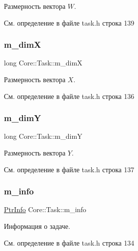 Размерность вектора $W$. 

См. определение в файле task.\+h строка 139

\hypertarget{class_core_1_1_task_a3314c516035accea22900aede28ee64b}{}\label{class_core_1_1_task_a3314c516035accea22900aede28ee64b} 
\subsubsection{\texorpdfstring{m\+\_\+dimX}{m\_dimX}}
{\footnotesize\ttfamily long Core\+::\+Task\+::m\+\_\+dimX\hspace{0.3cm}{\ttfamily [protected]}}

Размерность вектора $X$. 

См. определение в файле task.\+h строка 136

\hypertarget{class_core_1_1_task_aa317bebd7f5dbfa5dc86463cb0377b12}{}\label{class_core_1_1_task_aa317bebd7f5dbfa5dc86463cb0377b12} 
\subsubsection{\texorpdfstring{m\+\_\+dimY}{m\_dimY}}
{\footnotesize\ttfamily long Core\+::\+Task\+::m\+\_\+dimY\hspace{0.3cm}{\ttfamily [protected]}}

Размерность вектора $Y$. 

См. определение в файле task.\+h строка 137

\hypertarget{class_core_1_1_task_a259973874ba0b34cd7faccfd35dd683f}{}\label{class_core_1_1_task_a259973874ba0b34cd7faccfd35dd683f} 
\subsubsection{\texorpdfstring{m\+\_\+info}{m\_info}}
{\footnotesize\ttfamily \hyperlink{namespace_core_a647483da8a1266d5bbd3e9bb5cd66d08}{Ptr\+Info} Core\+::\+Task\+::m\+\_\+info\hspace{0.3cm}{\ttfamily [protected]}}

Информация о задаче. 

См. определение в файле task.\+h строка 134

